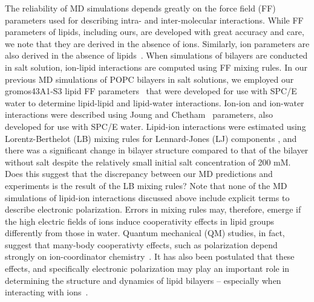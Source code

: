 The reliability of MD simulations depends greatly on the force field (FF) parameters 
used for describing intra- and inter-molecular interactions. 
While FF parameters of lipids, including ours, are developed with great accuracy and care, 
we note that they are derived in the absence of ions. 
Similarly, ion parameters are also derived in the absence of lipids~\cite{joung:2008}. 
When simulations of bilayers are conducted in salt solution, 
ion-lipid interactions are computed using FF mixing rules. 
In our previous MD simulations of POPC bilayers in salt solutions, 
we employed our gromos43A1-S3 lipid FF parameters~\cite{chiu:2009} 
that were developed for use with SPC/E water to determine lipid-lipid and lipid-water interactions. 
Ion-ion and ion-water interactions were described using Joung and Chetham~\cite{joung:2008} parameters, 
also developed for use with SPC/E water. 
Lipid-ion interactions were estimated using Lorentz-Berthelot (LB) 
mixing rules for Lennard-Jones (LJ) components
, and there was a significant change in bilayer 
structure compared to that of the bilayer without salt despite the relatively small initial salt concentration of 200 mM.
Does this suggest that the discrepancy between our MD predictions and experiments 
is the result of the LB mixing rules?  
Note that none of the MD simulations of lipid-ion interactions discussed above
include explicit terms to describe electronic polarization. 
Errors in mixing rules may, therefore, 
emerge if the high electric fields of ions induce 
cooperativity effects in lipid groups 
differently from those in water. 
Quantum mechanical (QM) studies, in fact, suggest that many-body 
cooperativty effects, such as polarization depend  
strongly on ion-coordinator chemistry~\cite{varma:2010,wineman:2019}. 
It has also been postulated that these effects, and specifically 
electronic 
polarization may play an
important role in determining the structure and dynamics of lipid
bilayers
-- especially when interacting with 
ions~\cite{vacha:2010,vorobyov:2010,melcr:2018,chen:2021,lee:2008:origin}.

